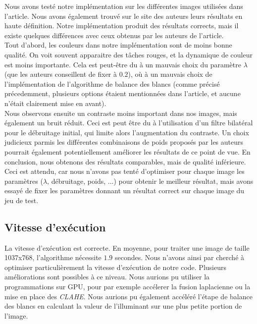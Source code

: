\documentclass[twoside]{article}
\begin{document}
Nous avons testé notre implémentation sur les différentes images utilisées dans l'article. Nous avons également trouvé sur le site des auteurs leurs résultats en haute définition. Notre implémentation produit des résultats corrects, mais il existe quelques différences avec ceux obtenus par les auteurs de l'article. \\
Tout d'abord, les couleurs dans notre implémentation sont de moins bonne qualité. On voit souvent apparaitre des tâches rouges, et la dynamique de couleur est moins importante. Cela est peut-être du à un mauvais choix du paramètre $\lambda$ (que les auteurs conseillent de fixer à $0.2$), où à un mauvais choix de l'implémentation de l'algorithme de balance des blancs (comme précisé précedemment, plusieurs options étaient mentionnées dans l'article, et aucune n'était clairement mise en avant).\\
Nous observons ensuite un contraste moins important dans nos images, mais également un bruit réduit. Ceci est peut être du à l'utilisation d'un filtre bilatéral pour le débruitage initial, qui limite alors l'augmentation du contraste. Un choix judicieux parmis les différentes combinaisons de poids proposés par les auteurs pourrait également potentiellement améliorer les résultats de ce point de vue.
En conclusion, nous obtenons des résultats comparables, mais de qualité inférieure. Ceci est attendu, car nous n'avons pas tenté d'optimiser pour chaque image les paramètres ($\lambda$, débruitage, poids, ...) pour obtenir le meilleur résultat, mais avons essayé de fixer les paramètres donnant un résultat correct sur chaque image du jeu de test.

\subsection{Vitesse d'exécution}
La vitesse d'exécution est correcte. En moyenne, pour traiter une image de taille 1037x768, l'algorithme nécessite $1.9$ secondes. Nous n'avons ainsi par cherché à optimiser particulièrement la vitesse d'exécution de notre code. Plusieurs améliorations sont possibles à ce niveau. Nous aurions pu utiliser la programmations sur GPU, pour par exemple accélerer la fusion laplacienne ou la mise en place des \emph{CLAHE}. Nous aurions pu également accéléré l'étape de balance des blancs en calculant la valeur de l'illuminant sur une plus petite portion de l'image.

\end{document}
